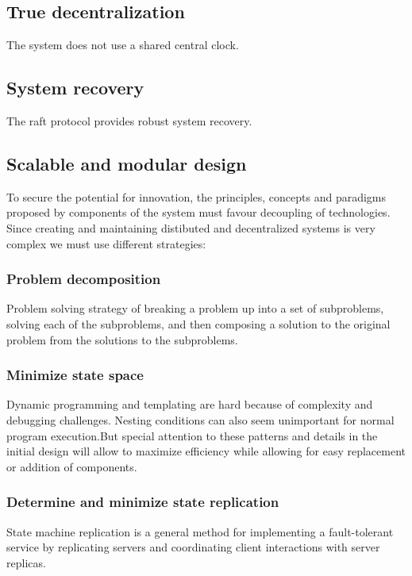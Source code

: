 \documentclass[]{article}
\begin{document}
	\subsection{True decentralization}
	The system does not use a shared central clock.
	\subsection{System recovery}
	The raft protocol provides robust system recovery.

	\subsection{Scalable and modular design}
	To secure the potential for innovation, the principles, 
	concepts and paradigms proposed by components of the system
	must favour decoupling of technologies. 
	Since creating and maintaining distibuted and decentralized systems
	is very complex we must use different strategies: 
	\subsubsection{Problem decomposition}
	Problem solving strategy of breaking a problem up into a set of subproblems, solving each of the subproblems, and then composing a solution to the original problem from the solutions to the subproblems.
	\subsubsection{Minimize state space}
	Dynamic programming and templating are hard because of complexity and debugging challenges. Nesting conditions can also seem unimportant for normal program execution.But special attention to these patterns and details in the initial design will allow to maximize efficiency while allowing for easy replacement or addition of components.   
	\subsubsection{Determine and minimize state replication}
	State machine replication is a general method for implementing a fault-tolerant service by replicating servers and coordinating client interactions with server replicas. 
\end{document}
